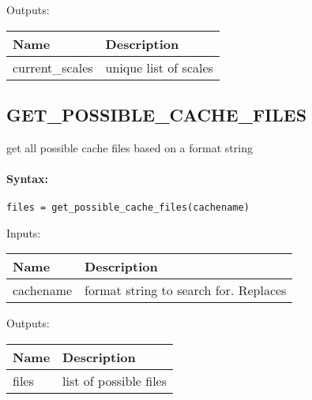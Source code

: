 \bigskip
Outputs:

\begin{tabular}{|p{}|p{}|}
\hline
\textbf{Name} & \textbf{Description} \\
\hline \hline
current\_scales & unique list of scales  \\ \hline
\end{tabular}

\subsection{GET\_POSSIBLE\_CACHE\_FILES}

get all possible cache files based on a format string

\paragraph{Syntax:} \verb|files = get_possible_cache_files(cachename)|

\bigskip
Inputs:

\begin{tabular}{|p{}|p{}|}
\hline
\textbf{Name} & \textbf{Description} \\
\hline \hline
cachename & format string to search for. Replaces %
\end{tabular}

\bigskip
Outputs:

\begin{tabular}{|p{}|p{}|}
\hline
\textbf{Name} & \textbf{Description} \\
\hline \hline
files & list of possible files  \\ \hline
\end{tabular}
